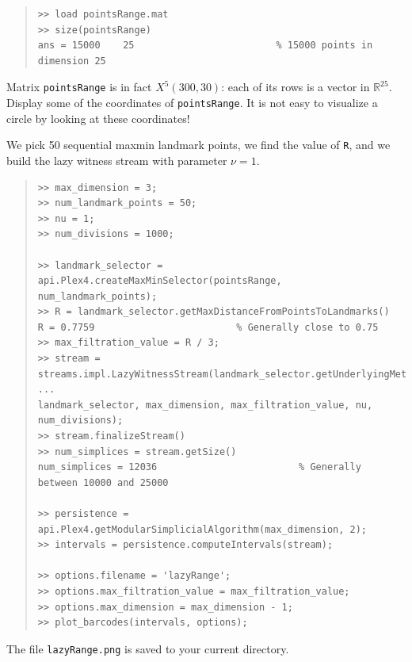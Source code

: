\documentclass[amscd, amssymb, verbatim]{amsart}[12pt]
\theoremstyle{remark}
\theoremstyle{remark}
\theoremstyle{remark}
\newcommand{\R}{\mathbb{R}}
\begin{document}
\begin{quote} \begin{verbatim}
>> load pointsRange.mat
>> size(pointsRange) 
ans = 15000    25                         % 15000 points in dimension 25
\end{verbatim} \end{quote}

Matrix \texttt{pointsRange} is in fact $X^5(300,30)$: each of its rows is a vector in $\R^{25}$. Display some of the coordinates of \texttt{pointsRange}. It is not easy to visualize a circle by looking at these coordinates! 

We pick 50 sequential maxmin landmark points, we find the value of \texttt{R}, and we build the lazy witness stream with parameter $\nu = 1$. 

\begin{quote} \begin{verbatim}
>> max_dimension = 3;
>> num_landmark_points = 50;
>> nu = 1;
>> num_divisions = 1000;

>> landmark_selector = api.Plex4.createMaxMinSelector(pointsRange, num_landmark_points);
>> R = landmark_selector.getMaxDistanceFromPointsToLandmarks() 
R = 0.7759                         % Generally close to 0.75
>> max_filtration_value = R / 3;
>> stream = streams.impl.LazyWitnessStream(landmark_selector.getUnderlyingMetricSpace(), ...
landmark_selector, max_dimension, max_filtration_value, nu, num_divisions);
>> stream.finalizeStream()
>> num_simplices = stream.getSize()
num_simplices = 12036                         % Generally between 10000 and 25000

>> persistence = api.Plex4.getModularSimplicialAlgorithm(max_dimension, 2);
>> intervals = persistence.computeIntervals(stream);

>> options.filename = 'lazyRange';
>> options.max_filtration_value = max_filtration_value;
>> options.max_dimension = max_dimension - 1;
>> plot_barcodes(intervals, options);
\end{verbatim} \end{quote}

The file \texttt{lazyRange.png} is saved to your current directory.
\end{document}
